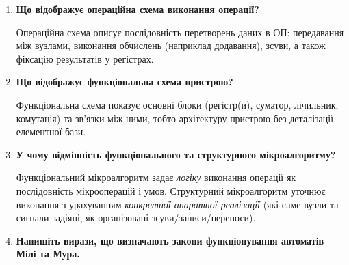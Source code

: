 \documentclass[12pt,a4paper]{article}
\begin{document}
\begin{enumerate}
        \begin{enumerate}
            \item Для кожної операції будують операційну схему та функціональний мікроалгоритм (Ф-мікроалгоритм).
            \item Обирають розрядність регістрів, суматорів, шин, лічильників; виконують логічне моделювання (таблиці станів, часові діаграми).
            \item Розробляють функціональну та принципову схеми операційного пристрою (ОП) із зазначенням керувальних входів.
            \item Складають структурний мікроалгоритм (С-мікроалгоритм) з урахуванням конкретної реалізації вузлів.
            \item Виконують синтез пристрою керування (керуючого автомата) та формують керувальні сигнали.
            \item Формують повну принципову/функціональну схему всього АЛП та проводять перевірку (синхронну/асинхронну).
        \end{enumerate}

        \item \textbf{Що відображує операційна схема виконання операції?}

        Операційна схема описує послідовність перетворень даних в ОП: передавання між вузлами,
        виконання обчислень (наприклад додавання), зсуви, а також фіксацію результатів у регістрах.

        \item \textbf{Що відображує функціональна схема пристрою?}

        Функціональна схема показує основні блоки (регістр(и), суматор, лічильник, комутація)
        та зв'язки між ними, тобто архітектуру пристрою без деталізації елементної бази.

        \item \textbf{У чому відмінність функціонального та структурного мікроалгоритму?}

        Функціональний мікроалгоритм задає \emph{логіку} виконання операції як послідовність мікрооперацій і умов.
        Структурний мікроалгоритм уточнює виконання з урахуванням \emph{конкретної апаратної реалізації}
        (які саме вузли та сигнали задіяні, як організовані зсуви/записи/переноси).

        \item \textbf{Напишіть вирази, що визначають закони функціонування автоматів Мілі та Мура.}


\end{enumerate}
\end{document}
